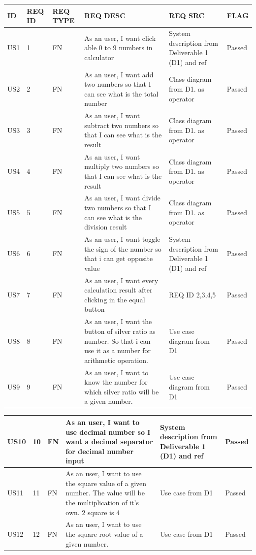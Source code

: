 \documentclass{article}
\begin{document}
\begin{tabular}{ |p{1cm}|p{1cm}|p{1cm}|p{3cm}|p{3cm}|p{2cm}| }
\hline
 ID & REQ ID & REQ TYPE & REQ DESC & REQ SRC  & FLAG \\
 \hline
  US1 & 1 & FN & As an user, I want click able 0 to
9 numbers in calculator & System description from Deliverable 1 (D1) and ref \cite{js_story} & Passed \\
 \hline
 US2 & 2 & FN & As an user, I want add two numbers so that I can see what is the
total number & Class diagram from D1. as operator & Passed \\
 \hline
 US3 & 3 & FN & As an user, I want subtract two
numbers so that I can see what
is the result & Class diagram from D1. as operator  & Passed \\
 \hline
 US4 & 4 & FN & As an user, I want multiply two
numbers so that I can see what
is the result & Class diagram from D1. as operator  & Passed \\
 \hline
 US5 & 5 & FN & As  an  user,  I  want  divide  two
numbers so that I can see what
is the division result & Class diagram from D1. as operator  & Passed \\
 \hline
 US6 & 6 & FN & As an user, I want toggle the sign
of the number so that i can get
opposite value & System description from Deliverable 1 (D1) and ref \cite{cal_story}  & Passed \\
 \hline
 US7 & 7 & FN & As  an  user,  I  want  every  calculation result after clicking in the
equal button & REQ ID 2,3,4,5  & Passed \\
 \hline
 US8 & 8 & FN & As an user, I want the button of
silver ratio as number.  So that i
can use it as a number for arithmetic operation. & Use case diagram from D1  & Passed \\
 \hline
 US9 & 9 & FN & As an  user,  I want  to know the
number for which silver ratio will
be a given number. & Use case diagram from D1  & Passed \\
 \hline
\end{tabular}


\begin{tabular}{ |p{1cm}|p{1cm}|p{1cm}|p{3cm}|p{3cm}|p{2cm}| }
 \hline
 US10 & 10 & FN & As an user, I want to use decimal
number so I want a decimal separator for decimal number input & System description from Deliverable 1 (D1) and ref \cite{js_story}  & Passed \\
\hline
 US11 & 11 & FN & As  an  user,  I  want  to  use  the
square value of a given number. The value will be the
multiplication of it’s own.  2 square is 4 & Use case from D1  & Passed \\
 \hline
 US12 & 12 & FN & As  an  user,  I  want  to  use  the
square root value of a given number. & Use case from D1 & Passed \\
\hline
\end{tabular}
\end{document}
